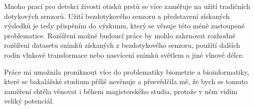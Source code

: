 Mnoho prací pro detekci živosti otisků prstů se více zaměřuje na užití tradičních dotykových senzorů. Užití bezdotykového senzoru a představení získaných výsledků je tedy přispěním do výzkumu, který se věnuje této méně zastoupené problematice. Rozšíření možné budoucí práce by mohlo zahrnovat rozhodně rozšíření datasetu snímků získaných z bezdotykového senzoru, použítí dalších rodin vlnkové transformace nebo nasvícení snímků světlem o jiné vlnové délce.

Práce mi umožnila proniknout více do problematiky biometrie a bioinformatiky, které se bakalářské studium příliš nevěnuje a přesvědčila mě, že bych se tomuto zaměření chtěla věnovat i během magisterského studia, protože v něm vidím veliký potenciál.
 

\label{zaver}


